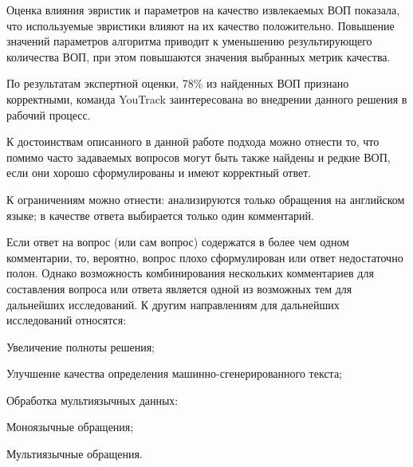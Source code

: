 Оценка влияния эвристик и параметров на качество извлекаемых ВОП показала, что используемые эвристики влияют на их качество положительно. Повышение значений параметров алгоритма приводит к уменьшению результирующего количества ВОП, при этом повышаются значения выбранных метрик качества.

По результатам экспертной оценки, 78\% из найденных ВОП признано корректными, команда YouTrack заинтересована во внедрении данного решения в рабочий процесс.

К достоинствам описанного в данной работе подхода можно отнести то, что помимо часто задаваемых вопросов могут быть также найдены и редкие ВОП, если они хорошо сформулированы и имеют корректный ответ.

К ограничениям можно отнести: анализируются только обращения на английском языке; в качестве ответа выбирается только один комментарий. 

Если ответ на вопрос (или сам вопрос) содержатся в более чем одном комментарии, то, вероятно, вопрос плохо сформулирован или ответ недостаточно полон. Однако возможность комбинирования нескольких комментариев для составления вопроса или ответа является одной из возможных тем для дальнейших исследований. К другим направлениям для дальнейших исследований относятся:

\begin{itemize*}
\item Увеличение полноты решения;
\item Улучшение качества определения машинно-сгенерированного текста;
\item Обработка мультиязычных данных: 
\begin{itemize*}
\item Моноязычные обращения; 
\item Мультиязычные обращения.
\end{itemize*}
\end{itemize*}
